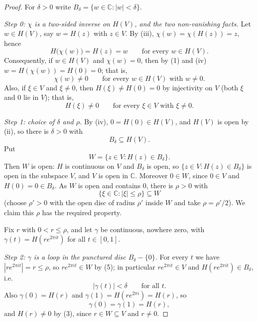 \begin{proof}
For $\delta>0$ write $B_\delta=\{w\in\mathbb{C}:|w|<\delta\}$.

\emph{Step 0: $\chi$ is a two-sided inverse on $H(V)$, and the two
non-vanishing facts.}  Let $w\in H(V)$, say $w=H(z)$ with $z\in V$.  By (iii),
$\chi(w)=\chi(H(z))=z$, hence
\begin{equation}\tag{1}
  H\bigl(\chi(w)\bigr)=H(z)=w\qquad\text{for every }w\in H(V).
\end{equation}
Consequently, if $w\in H(V)$ and $\chi(w)=0$, then by (1) and (iv)
$w=H(\chi(w))=H(0)=0$; that is,
\begin{equation}\tag{2}
  \chi(w)\neq0\qquad\text{for every }w\in H(V)\text{ with }w\neq0 .
\end{equation}
Also, if $\xi\in V$ and $\xi\neq0$, then $H(\xi)\neq H(0)=0$ by injectivity on
$V$ (both $\xi$ and $0$ lie in $V$); that is,
\begin{equation}\tag{3}
  H(\xi)\neq0\qquad\text{for every }\xi\in V\text{ with }\xi\neq0 .
\end{equation}

\emph{Step 1: choice of $\delta$ and $\rho$.}  By (iv), $0=H(0)\in H(V)$, and
$H(V)$ is open by (ii), so there is $\delta>0$ with
\begin{equation}\tag{4}
  B_\delta\subseteq H(V).
\end{equation}
Put
\[
  W=\{z\in V:H(z)\in B_\delta\}.
\]
Then $W$ is open: $H$ is continuous on $V$ and $B_\delta$ is open, so
$\{z\in V:H(z)\in B_\delta\}$ is open in the subspace $V$, and $V$ is open in
$\mathbb{C}$.  Moreover $0\in W$, since $0\in V$ and $H(0)=0\in B_\delta$.  As
$W$ is open and contains $0$, there is $\rho>0$ with
\begin{equation}\tag{5}
  \{\xi\in\mathbb{C}:|\xi|\le\rho\}\subseteq W
\end{equation}
(choose $\rho'>0$ with the open disc of radius $\rho'$ inside $W$ and take
$\rho=\rho'/2$).  We claim this $\rho$ has the required property.

Fix $r$ with $0<r\le\rho$, and let $\gamma$ be continuous, nowhere zero, with
$\gamma(t)=H(re^{2\pi it})$ for all $t\in[0,1]$.

\emph{Step 2: $\gamma$ is a loop in the punctured disc $B_\delta-\{0\}$.}  For
every $t$ we have $|re^{2\pi it}|=r\le\rho$, so $re^{2\pi it}\in W$ by (5); in
particular $re^{2\pi it}\in V$ and $H(re^{2\pi it})\in B_\delta$, i.e.
\begin{equation}\tag{6}
  |\gamma(t)|<\delta\qquad\text{for all }t .
\end{equation}
Also $\gamma(0)=H(r)$ and $\gamma(1)=H(re^{2\pi i})=H(r)$, so
\begin{equation}\tag{7}
  \gamma(0)=\gamma(1)=H(r),
\end{equation}
and $H(r)\neq0$ by (3), since $r\in W\subseteq V$ and $r\neq0$.


\end{proof}
